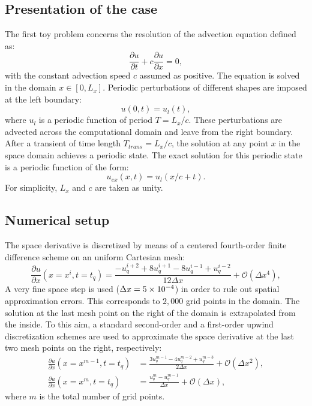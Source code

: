 
\subsection{Presentation of the case}

The first toy problem concerns the resolution of the
advection equation defined as:
\begin{equation}
  \label{eq:convection}
  \frac{\partial u}{\partial t} + c \frac{\partial u}{\partial x} = 0,
\end{equation}
with the constant advection speed $c$ assumed as positive. 
The equation is solved in the domain $x \in [0, L_x]$. 
Periodic perturbations of different shapes are imposed at the left boundary:
\begin{equation}
   u(0, t) = u_l (t),
\end{equation}
where $u_l$ is a periodic function of period $T=L_x/c$.
These perturbations are advected across the computational 
domain and leave from the right boundary. After a transient of time length $T_{trans}=L_x/c$, 
the solution at any point $x$ in the space domain achieves a periodic state. 
The exact solution for this periodic state is a periodic function of the form:
\begin{equation}
    u_{ex}(x,t)=u_l(x/c+t).
\end{equation}
For simplicity, $L_x$ and $c$ are taken as unity.

\subsection{Numerical setup}

The space derivative is discretized by means of a centered 
fourth-order finite difference scheme on an uniform Cartesian mesh:
\begin{equation}
    \frac{\partial u}{\partial x} (x = x^i, t=t_q) =
    \frac{-u^{i+2}_{q} + 8 u^{i+1}_{q} - 8 u^{i-1}_{q} + u^{i-2}_{q}}{12\Delta x}
    + \mathcal{O} (\Delta x^4),
    \label{eq:convection_center4}
\end{equation}
A very fine space step is used ($\Delta x=5\times 10^{-4}$) in order to rule 
out spatial approximation errors. This corresponds to $2,000$ grid points
in the domain. 
The solution at the last mesh 
point on the right of the domain is extrapolated 
from the inside. To this aim, a standard second-order 
and a first-order upwind discretization schemes
are used to approximate the space derivative at 
the last two mesh points on the right, respectively:
\begin{align}
    \frac{\partial u}{\partial x} (x = x^{m-1}, t=t_q) &=
    \frac{3 u^{m-1}_{q} - 4 u^{m-2}_{q} + u^{m-3}_{q}}{2\Delta x} + \mathcal{O} (\Delta x^2), \\
    \frac{\partial u}{\partial x} (x = x^m, t=t_q) &= 
    \frac{u^{m}_{q} - u^{m-1}_{q}}{\Delta x} + \mathcal{O} (\Delta x),
\label{eq:upwind_scheme}
\end{align}
where $m$ is the total number of grid points.

